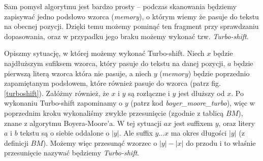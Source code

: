 Sam pomysł algorytmu \TBM jest bardzo prosty -- podczas skanowania będziemy zapisywać jedno podsłowo wzorca (\emph{memory}), o którym wiemy że pasuje do tekstu na obecnej pozycji. Dzięki temu możemy pominąć ten fragment przy sprawdzaniu dopasowania, oraz w przypadku jego braku możemy wykonać tzw. \emph{Turbo-shift}.

Opiszmy sytuację, w której możemy wykonać Turbo-shift. Niech $x$ będzie najdłuższym sufiksem wzorca, który pasuje do tekstu na danej pozycji, $a$ będzie pierwszą literą wzorca która nie pasuje, a niech $y$ ($memory$) będzie poprzednio zapamiętanym podsłowem, które również pasuje do wzorca (patrz fig. \ref{turboshift}). Załóżmy również, że $x$ i $y$ są rozłączne i $y$ jest dłuższy od $x$. Po wykonaniu Turbo-shift zapominamy o $y$ (patrz kod \emph{boyer\_moore\_turbo}), więc w poprzednim kroku wykonaliśmy zwykłe przesunięcie (zgodnie z tablicą $BM$), znane z algorytmu Boyera-Moore'a. W tej sytuacji $ax$ jest suffixem $y$, oraz litery $a$ i $b$ tekstu są o siebie oddalone o $|y|$. Ale suffix $y\ldots x$ ma okres długości $|y|$ (z definicji $BM$). Możemy więc przesunąć wzorzec o $|y| - |x|$ do przodu i to właśnie przesunięcie nazywać będziemy \emph{Turbo-shift}.

